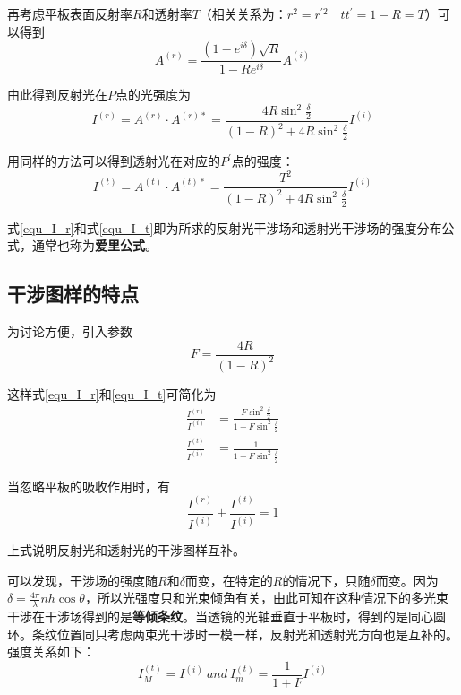 \documentclass[UTF8]{ctexart}
\begin{document}
\noindent 再考虑平板表面反射率$ R $和透射率$ T $（相关关系为：$ r^{2}=r^{\prime 2}\quad t t^{\prime}=1-R=T $）可以得到
\begin{equation}
A^{(r)}=\frac{\left(1-e^{i \delta}\right) \sqrt{R}}{1-R e^{i \delta}} A^{(i)}
\end{equation}

	由此得到反射光在$ P $点的光强度为
	\begin{equation}
	I^{(r)}=A^{(r)} \cdot A^{(r) *}=\frac{4 R \sin ^{2} \frac{\delta}{2}}{(1-R)^{2}+4 R \sin ^{2} \frac{\delta}{2}} I^{(i)}\label{equ_I_r}
	\end{equation}

	用同样的方法可以得到透射光在对应的$ P^{\prime} $点的强度：
	\begin{equation}
	I^{(t)}=A^{(t)} \cdot A^{(t) *}=\frac{T^{2}}{(1-R)^{2}+4 R \sin ^{2} \frac{\delta}{2}} I^{(i)}\label{equ_I_t}
	\end{equation}
	
	式\ref{equ_I_r}和式\ref{equ_I_t}即为所求的反射光干涉场和透射光干涉场的强度分布公式，通常也称为\textbf{爱里公式}。
	
	\subsection{干涉图样的特点}
	为讨论方便，引入参数
	\begin{equation}
		F=\frac{4 R}{(1-R)^{2}}\label{equ_F}
	\end{equation}
	
\noindent 这样式\ref{equ_I_r}和\ref{equ_I_t}可简化为
\begin{equation}
	\begin{aligned}
		\frac{I^{(r)}}{I^{(i)}}&=\frac{F \sin ^{2} \frac{\delta}{2}}{1+F \sin ^{2} \frac{\delta}{2}}\\
		\frac{I^{(t)}}{I^{(i)}}&=\frac{1}{1+F \sin ^{2} \frac{\delta}{2}}
	\end{aligned}
\end{equation}

\noindent 当忽略平板的吸收作用时，有
\begin{equation}
\frac{I^{(r)}}{I^{(i)}}+\frac{I^{(t)}}{I^{(i)}}=1
\end{equation}

\noindent 上式说明反射光和透射光的干涉图样互补。

	可以发现，干涉场的强度随$ R $和$ \delta $而变，在特定的$ R $的情况下，只随$ \delta $而变。因为$ \delta=\frac{4 \pi}{\lambda} n h \cos \theta $，所以光强度只和光束倾角有关，由此可知在这种情况下的多光束干涉在干涉场得到的是\textbf{等倾条纹}。当透镜的光轴垂直于平板时，得到的是同心圆环。条纹位置同只考虑两束光干涉时一模一样，反射光和透射光方向也是互补的。强度关系如下：
	\begin{equation}
		I_{M}^{(t)}=I^{(i)}\ and\ I_{m}^{(t)}=\frac{1}{1+F} I^{(i)}
	\end{equation}
	
\end{document}
